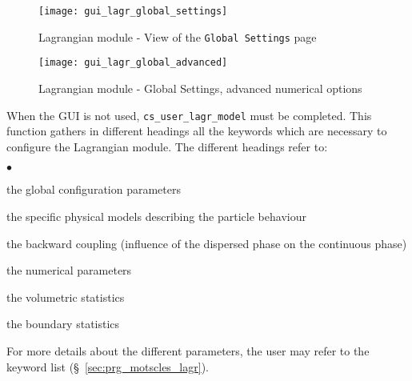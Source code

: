 {{{\begin{figure}[ht]
\begin{center}
\texttt{[image: gui\_lagr\_global\_settings]}
\caption{Lagrangian module - View of the \texttt{Global Settings} page}
\label{fig:Ini-Lag1}
\end{center}
\end{figure}
%
 \begin{figure}[ht]
 \begin{center}
 \texttt{[image: gui\_lagr\_global\_advanced]}
 \caption{Lagrangian module - Global Settings, advanced numerical options}
 \label{fig:Ini-Lag3}
 \end{center}
 \end{figure}
%
%


\noindent
When the GUI is not used, \texttt{cs\_user\_lagr\_model} must be completed. This function
gathers in different headings all the keywords which are
necessary to configure the Lagrangian module. The different headings refer to:
\begin{list}{$\bullet$}{}
\item the global configuration parameters
\item the specific physical models describing the particle behaviour
\item the backward coupling (influence of the dispersed phase on the
      continuous phase)
\item the numerical parameters
\item the volumetric statistics
\item the boundary statistics
\end{list}
%
\noindent
For more details about the different parameters, the user may refer to the
keyword list (\S~\ref{sec:prg_motscles_lagr}).%


}}}
